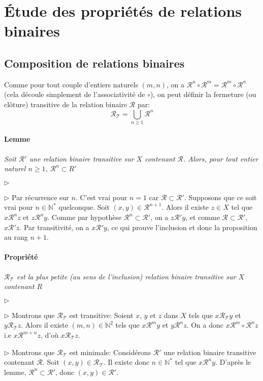 \documentclass{scrartcl}
\begin{document}
	\section{Étude des propriétés de relations binaires}
		\subsection{Composition de relations binaires}
			Comme pour tout couple d'entiers naturels $(m,n)$, 
			on a $\mathcal{R}^n\circ\mathcal{R}^m = \mathcal{R}^m\circ\mathcal{R}^n$ (cela découle simplement de l'associativité de $\circ$), 
			on peut définir la fermeture (ou clôture) transitive de la relation binaire $\mathcal{R}$ par:
			\[
				\mathcal{R_T} = \bigcup\limits_{n\geq 1} \mathcal{R}^n
			\]
		
			\paragraph{Lemme} \textsl{Soit $\mathcal{R}'$ une relation binaire transitive sur $X$ contenant $\mathcal{R}$. 
			Alors, pour tout entier naturel $n \geq 1$, $\mathcal{R}^n \subset R'$}	
			\begin{labeling}{$\triangleright$}
				\item [$\triangleright$] Par récurrence sur $n$. 
				C'est vrai pour $n=1$ car $\mathcal{R}\subset\mathcal{R}'$.
				Supposons que ce soit vrai pour $n\in\mathbb{N}^*$ quelconque.
				Soit $(x,y)\in \mathcal{R}^{n+1}$. 
				Alors il existe $z \in X$ tel que $x\mathcal{R}^nz$ et $z\mathcal{R}^ny$.
				Comme par hypothèse $\mathcal{R}^n \subset \mathcal{R}'$, on a $z\mathcal{R}'y$, 
				et comme $\mathcal{R} \subset \mathcal{R}'$, $x\mathcal{R}'z$. Par transitivité, on a $x\mathcal{R}'y$,
				ce qui prouve l'inclusion et donc la proposition au rang $n+1$.
			\end{labeling}

			\paragraph{Propriété} \textsl{$\mathcal{R_T}$ est la plus petite (au sens de l'inclusion) relation binaire transitive sur $X$ contenant $R$}
			\begin{labeling}{$\triangleright$}
				\item [$\triangleright$] Montrons que $\mathcal{R_T}$ est transitive:
				Soient $x$, $y$ et $z$ dans $X$ tels que $x\mathcal{R_T}y$ et $y\mathcal{R_T}z$.
				Alors il existe $(m,n)\in\mathbb{N}^2$ tels que $x\mathcal{R}^my$ et $y\mathcal{R}^nz$.
				On a donc $x\mathcal{R}^m\circ\mathcal{R}^nz$ i.e $x\mathcal{R}^{m+n}z$, d'où $x\mathcal{R_T}z$.
				\item [$\triangleright$] Montrons que $\mathcal{R_T}$ est minimale:
				Considérons $\mathcal{R}'$ une relation binaire transitive contenant $\mathcal{R}$. Soit $(x,y) \in \mathcal{R_T}$.
				Il existe donc $n\in\mathbb{N}^*$ tel que $x\mathcal{R}^ny$. D'après le lemme, $\mathcal{R}^n\subset\mathcal{R}'$,
				donc $(x,y)\in\mathcal{R}'$.
			\end{labeling}
\end{document}
